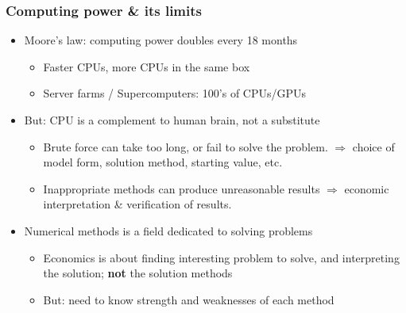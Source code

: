 \documentclass[bigger]{beamer}
\begin{document}
\begin{frame}%

\frametitle{Computing power \& its limits}

\begin{itemize}
\item Moore's law: computing power doubles every 18 months

\begin{itemize}
\item Faster CPUs, more CPUs in the same box

\item Server farms / Supercomputers: 100's of CPUs/GPUs
\end{itemize}

\item But: CPU is a complement to human brain, not a substitute

\begin{itemize}
\item Brute force can take too long, or fail to solve the problem.\newline
$\Rightarrow $ choice of model form, solution method, starting value, etc.

\item Inappropriate methods can produce unreasonable results\newline
$\Rightarrow $ economic interpretation \& verification of results.
\end{itemize}

\item Numerical methods is a field dedicated to solving problems

\begin{itemize}
\item Economics is about finding interesting problem to solve, \newline
and interpreting the solution; \textbf{not} the solution methods

\item But: need to know strength and weaknesses of each method
\end{itemize}
\end{itemize}


\end{frame}%
\end{document}
